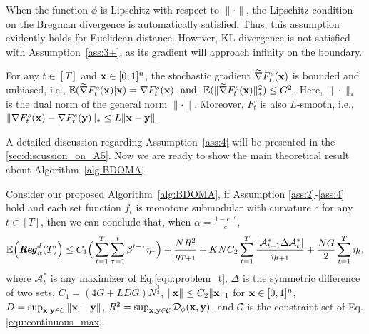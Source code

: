 \begin{remark}
	When the function $\phi$ is Lipschitz with respect to $\|\cdot\|$, the Lipschitz condition on the Bregman divergence is automatically satisfied. Thus, this assumption evidently holds for Euclidean distance. However, KL divergence is not satisfied with Assumption~\ref{ass:3+}, as its gradient will approach infinity on the boundary. %
\end{remark}
\begin{assumption}\label{ass:4}For any $t\in[T]$ and $\mathbf{x}\in[0,1]^{n}$, the stochastic gradient $\widetilde{\nabla}F_{t}^{s}(\mathbf{x})$ is bounded and unbiased, i.e., $\E(\widetilde{\nabla}F^{s}_{t}(\x)|\x)=\nabla F^{s}_{t}(\x)\ \ \text{and}\ \  \E(\|\widetilde{\nabla}F^{s}_{t}(\x)\|_{*}^{2})\le G^{2}$.	Here, $\|\cdot\|_{*}$ is the dual norm of  the general norm $\|\cdot\|$. Moreover, $F_{t}$ is also $L$-smooth, i.e., $\|\nabla F^{s}_{t}(\mathbf{x})-\nabla F^{s}_{t}(\mathbf{y})\|_{*}\le L\|\mathbf{x}-\mathbf{y}\|$.
	\end{assumption}\vspace{-0.2em}
A detailed discussion regarding Assumption~\ref{ass:4}  will be presented in the \cref{sec:discussion_on_A5}. Now we are ready to show the main theoretical result about Algorithm~\ref{alg:BDOMA}.
	\begin{theorem}
		\label{thm:final_one}
		Consider our proposed Algorithm~\ref{alg:BDOMA}, if Assumption \ref{ass:2}-\ref{ass:4} hold and each set function $f_{t}$ is monotone submodular with curvature $c$ for any $t\in[T]$, then we can conclude that, when $\alpha=\frac{1-e^{-c}}{c}$,	\vspace{-0.7em}
		\begin{equation}\label{equ:thm1_equation_uncomplete}
				\mathbb{E}\Big(\textbf{\emph{Reg}}^{d}_{\alpha}(T)\Big)\le C_{1}\Big(\sum_{t=1}^{T}\sum_{\tau=1}^{t}\beta^{t-\tau}\eta_{\tau}\Big)+\frac{NR^{2}}{\eta_{T+1}}+KNC_{2}\sum_{t=1}^{T}\frac{|\mathcal{A}_{t+1}^{*}\Delta\mathcal{A}_{t}^{*}|}{\eta_{t+1}}+\frac{NG}{2}\sum_{t=1}^{T}\eta_{t},
		\end{equation} where $\mathcal{A}_{t}^{*}$ is any maximizer of Eq.\eqref{equ:problem_t}, $\Delta$ is the symmetric difference of two sets, $C_{1}=(4G+LDG)N^{\frac{3}{2}}$, $\|\mathbf{x}\|\le C_{2}\|\mathbf{x}\|_{1}$ for $\mathbf{x}\in[0,1]^{n}$, $D=\sup_{\mathbf{x},\mathbf{y}\in\mathcal{C}}\|\mathbf{x}-\mathbf{y}\|$, $R^{2}=\sup_{\mathbf{x},\mathbf{y}\in\mathcal{C}}\mathcal{D}_{\phi}(\mathbf{x},\mathbf{y})$, and $\mathcal{C}$ is the constraint set of Eq.\eqref{equ:continuous_max}. 
	\end{theorem}

